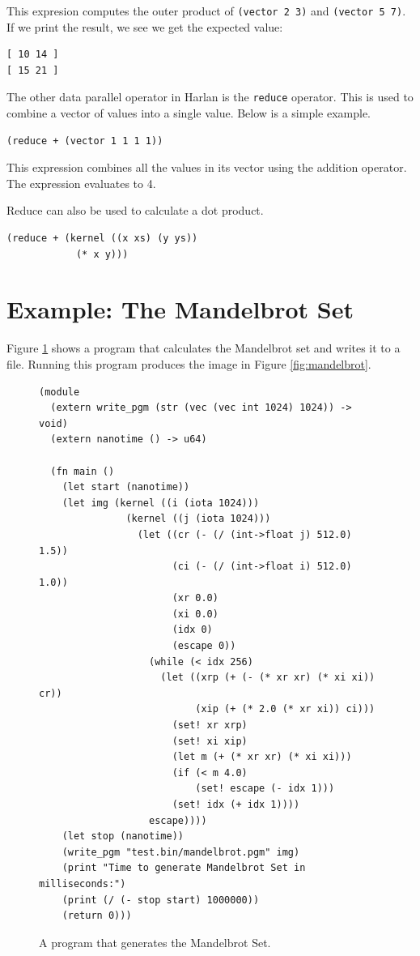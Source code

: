 \documentclass[oneside]{report}
\begin{document}
This expresion computes the outer product of \lstinline{(vector 2 3)}
and \lstinline{(vector 5 7)}. If we print the result, we see we get
the expected value:

\begin{verbatim}
[ 10 14 ]
[ 15 21 ]
\end{verbatim}

The other data parallel operator in Harlan is the \lstinline{reduce}
operator. This is used to combine a vector of values into a single
value. Below is a simple example.

\begin{lstlisting}
(reduce + (vector 1 1 1 1))  
\end{lstlisting}

This expression combines all the values in its vector using the
addition operator. The expression evaluates to 4.

Reduce can also be used to calculate a dot product.

\begin{lstlisting}
(reduce + (kernel ((x xs) (y ys))
            (* x y)))
\end{lstlisting}

\section{Example: The Mandelbrot Set}

Figure \ref{fig:mandelbrot-code} shows a program that calculates the
Mandelbrot set and writes it to a file.  Running this program produces
the image in Figure \ref{fig:mandelbrot}.

\begin{figure}
\begin{lstlisting}
(module
  (extern write_pgm (str (vec (vec int 1024) 1024)) -> void)
  (extern nanotime () -> u64)
  
  (fn main ()
    (let start (nanotime))
    (let img (kernel ((i (iota 1024)))
               (kernel ((j (iota 1024)))
                 (let ((cr (- (/ (int->float j) 512.0) 1.5))
                       (ci (- (/ (int->float i) 512.0) 1.0))
                       (xr 0.0)
                       (xi 0.0)
                       (idx 0)
                       (escape 0))
                   (while (< idx 256)
                     (let ((xrp (+ (- (* xr xr) (* xi xi)) cr))
                           (xip (+ (* 2.0 (* xr xi)) ci)))
                       (set! xr xrp)
                       (set! xi xip)
                       (let m (+ (* xr xr) (* xi xi)))
                       (if (< m 4.0)
                           (set! escape (- idx 1)))
                       (set! idx (+ idx 1))))
                   escape))))
    (let stop (nanotime))
    (write_pgm "test.bin/mandelbrot.pgm" img)
    (print "Time to generate Mandelbrot Set in milliseconds:")
    (print (/ (- stop start) 1000000))
    (return 0)))  
\end{lstlisting}
  
  \caption{A program that generates the Mandelbrot Set.}
  \label{fig:mandelbrot-code}
\end{figure}
\end{document}
